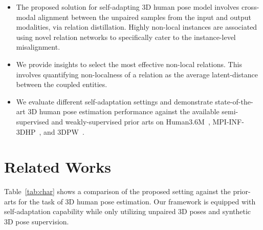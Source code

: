 \documentclass{article}
\begin{document}
\begin{itemize}\vspace{-2mm}
\item The proposed solution for self-adapting 3D human pose model involves cross-modal alignment between the unpaired samples from the input and output modalities, via relation distillation. 
Highly non-local instances are associated using novel relation networks to specifically cater to the instance-level misalignment. \vspace{-1mm}
\item We provide insights to select the most effective non-local relations. This involves quantifying non-localness of a relation as the average latent-distance between the coupled entities.


\vspace{-1mm}
\item We evaluate different self-adaptation settings and demonstrate   
state-of-the-art 3D human pose estimation performance against the available semi-supervised and weakly-supervised prior arts on Human3.6M~\cite{ionescu2013human3}, MPI-INF-3DHP~\cite{mehta2017monocular}, and 3DPW~\cite{von2018recovering}.

\end{itemize}






\section{Related Works} \label{sec:related-works}
\vspace{-2mm}
Table~\ref{tab:char} shows a comparison of the proposed setting against the prior-arts for the task of 3D human pose estimation. 
Our framework is equipped with self-adaptation capability while only utilizing unpaired 3D poses and synthetic 3D pose supervision.
\end{document}
